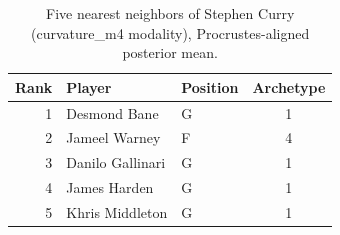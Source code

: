 \begin{table}[htbp]
  \centering\small
  \begin{tabular}{rllc}
    \toprule
    Rank & Player & Position & Archetype \\
    \midrule
    1 & Desmond Bane & G & 1 \\
    2 & Jameel Warney & F & 4 \\
    3 & Danilo Gallinari & G & 1 \\
    4 & James Harden & G & 1 \\
    5 & Khris Middleton & G & 1 \\
    \bottomrule
  \end{tabular}
  \caption{Five nearest neighbors of Stephen Curry (curvature_m4 modality), Procrustes-aligned posterior mean.}
  \label{tab:Stephen_Curry_neighbors_curvature_m4}
\end{table}

